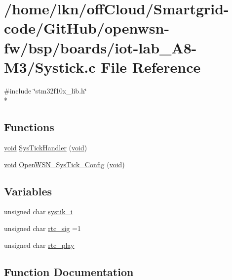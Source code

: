\hypertarget{iot-lab___a8-_m3_2_systick_8c}{}\section{/home/lkn/off\+Cloud/\+Smartgrid-\/code/\+Git\+Hub/openwsn-\/fw/bsp/boards/iot-\/lab\+\_\+\+A8-\/\+M3/\+Systick.c File Reference}
\label{iot-lab___a8-_m3_2_systick_8c}
{\ttfamily \#include \char`\"{}stm32f10x\+\_\+lib.\+h\char`\"{}}\\*
\subsection*{Functions}
\begin{DoxyCompactItemize}
\item 
\hyperlink{usb__devapi_8h_afabf60e7f57651d6d595a02c75f07cd0}{void} \hyperlink{iot-lab___a8-_m3_2_systick_8c_a737b0e743a1e6278e22d292c02925189}{Sys\+Tick\+Handler} (\hyperlink{usb__devapi_8h_afabf60e7f57651d6d595a02c75f07cd0}{void})
\item 
\hyperlink{usb__devapi_8h_afabf60e7f57651d6d595a02c75f07cd0}{void} \hyperlink{iot-lab___a8-_m3_2_systick_8c_a8399c4c08c30b8ab9f0b0b08d9b854ee}{Open\+W\+S\+N\+\_\+\+Sys\+Tick\+\_\+\+Config} (\hyperlink{usb__devapi_8h_afabf60e7f57651d6d595a02c75f07cd0}{void})
\end{DoxyCompactItemize}
\subsection*{Variables}
\begin{DoxyCompactItemize}
\item 
unsigned char \hyperlink{iot-lab___a8-_m3_2_systick_8c_a0eab83a5030febd8f48cd5bfa173968b}{systik\+\_\+i}
\item 
unsigned char \hyperlink{iot-lab___a8-_m3_2_systick_8c_add90cbf2f306b02a95fd2d83015f393d}{rtc\+\_\+sig} =1
\item 
unsigned char \hyperlink{iot-lab___a8-_m3_2_systick_8c_ae0a2d8ce5ed66a755934203ebdb666ac}{rtc\+\_\+play}
\end{DoxyCompactItemize}


\subsection{Function Documentation}
